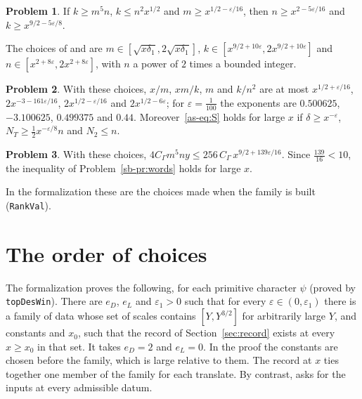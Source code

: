 \documentclass[reqno]{amsart}
\theoremstyle{definition}
\newtheorem{problem}{Problem}[section]
\theoremstyle{plain}
\newcommand{\tl}[1]{\texttt{#1}}
\begin{document}
\begin{problem}\label{pr:x2}
If \(k \ge m^5n\), \(k \le n^2x^{1/2}\) and \(m \ge x^{1/2-\varepsilon/16}\), then \(n \ge x^{2-5\varepsilon/16}\) and \(k \ge x^{9/2-5\varepsilon/8}\).
\end{problem}

The choices of \cite[Prop.~5.15]{Adr} and \cite[\S I.5]{Rub} are \(m \in [\sqrt{x\delta_1}, 2\sqrt{x\delta_1}]\), \(k \in [x^{9/2+10\varepsilon}, 2x^{9/2+10\varepsilon}]\) and \(n \in [x^{2+8\varepsilon}, 2x^{2+8\varepsilon}]\), with \(n\) a power of \(2\) times a bounded integer.

\begin{problem}\label{pr:substitute}
With these choices, \(x/m\), \(xm/k\), \(m\) and \(k/n^2\) are at most \(x^{1/2+\varepsilon/16}\), \(2x^{-3-161\varepsilon/16}\), \(2x^{1/2-\varepsilon/16}\) and \(2x^{1/2-6\varepsilon}\); for \(\varepsilon = \frac1{100}\) the exponents are \(0.500625\), \(-3.100625\), \(0.499375\) and \(0.44\).  Moreover~\eqref{as-eq:S} holds for large \(x\) if \(\delta \ge x^{-\varepsilon}\), \(N_T \ge \frac12 x^{-\varepsilon/8}n\) and \(N_2 \le n\).
\end{problem}

\begin{problem}\label{pr:139}
With these choices, \(4C_\Gamma m^5ny \le 256\,C_\Gamma\,x^{9/2+139\varepsilon/16}\).  Since \(\frac{139}{16} < 10\), the inequality of Problem~\ref{sb-pr:words} holds for large \(x\).
\end{problem}

In the formalization these are the choices made when the family is built (\tl{RankVal}).

\section{The order of choices}\label{sec:order}

The formalization proves the following, for each primitive character \(\psi\) (proved by \tl{topDesWin}).  There are \(e_D\), \(e_L\) and \(\varepsilon_1 > 0\) such that for every \(\varepsilon \in (0, \varepsilon_1)\) there is a family of data whose set of scales contains \([Y, Y^{3/2}]\) for arbitrarily large \(Y\), and constants and \(x_0\), such that the record of Section~\ref{sec:record} exists at every \(x \ge x_0\) in that set.  It takes \(e_D = 2\) and \(e_L = 0\).  In the proof the constants are chosen before the family, which is large relative to them.  The record at \(x\) ties together one member of the family for each translate.  By contrast, \cite[Hyp.~18.10]{Adr} asks for the inputs at every admissible datum.
\end{document}
